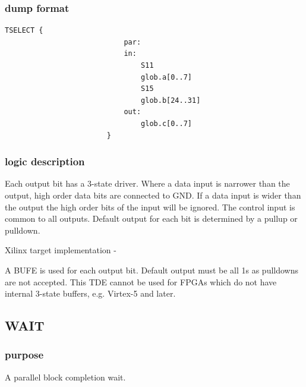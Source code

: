 \documentclass[10pt,a4paper,twoside,fleqn]{book}
\begin{document}
                    

                \subsubsection{dump format}

                    \begin{lstlisting}[gobble=20, language=tde]
                        TSELECT {
                            par:
                            in:
                                S11
                                glob.a[0..7]
                                S15
                                glob.b[24..31]
                            out:
                                glob.c[0..7]
                        }
                    \end{lstlisting}

                \subsubsection{logic description}

                    Each output bit has a 3-state driver. Where a data input is
                    narrower than the output, high order data bits are connected
                    to GND. If a data input is wider than the output the high
                    order bits of the input will be ignored. The control input
                    is common to all outputs. Default output for each bit is
                    determined by a pullup or pulldown.

                    Xilinx target implementation -

                    A BUFE is used for each output bit. Default output must be
                    all 1s as pulldowns are not accepted. This TDE cannot be
                    used for FPGAs which do not have internal 3-state buffers,
                    e.g. Virtex-5 and later.


            \subsection{WAIT}

                \subsubsection{purpose}

                    A parallel block completion wait.
\end{document}
